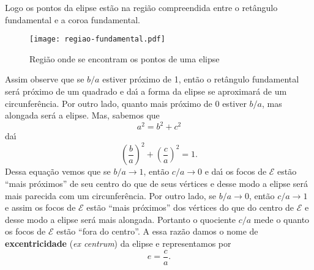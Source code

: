 Logo os pontos da elipse est\~ao na regi\~ao compreendida entre o ret\^angulo fundamental e a coroa fundamental.
\begin{figure}[!h]
  \centering
  \caption{Regi\~ao onde se encontram os pontos de uma elipse}
  \texttt{[image: regiao-fundamental.pdf]}


\end{figure}
Assim observe que se $b/a$ estiver pr\'oximo de 1, ent\~ao o ret\^angulo fundamental ser\'a pr\'oximo de um quadrado e da{\'\i} a forma da elipse se aproximar\'a de um circunfer\^encia. Por outro lado, quanto mais pr\'oximo de 0 estiver $b/a$, mas alongada ser\'a a elipse. Mas, sabemos que
\[
  a^2 = b^2 + c^2
\]
da{\'\i}
\[
  \left(\dfrac{b}{a}\right)^2 + \left(\dfrac{c}{a}\right)^2 = 1.
\]
Dessa equa\c{c}\~ao vemos que se $b/a \to 1$, ent\~ao $c/a \to 0$ e da{\'\i} os focos de $\mathcal{E}$ est\~ao ``mais pr\'oximos'' de seu centro do que de seus v\'ertices e desse modo a elipse ser\'a mais parecida com um circunfer\^encia. Por outro lado, se $b/a \to 0$, ent\~ao $c/a \to 1$ e assim os focos de $\mathcal{E}$ est\~ao ``mais pr\'oximos'' dos v\'ertices do que do centro de $\mathcal{E}$ e desse modo a elipse ser\'a mais alongada.  Portanto o quociente $c/a$ mede o quanto os focos de $\mathcal{E}$ est\~ao ``fora do centro''. A essa raz\~ao damos o nome de \textbf{excentricidade} (\textit{ex centrum}) da elipse e representamos por
\[
  e = \dfrac{c}{a}.
\]

